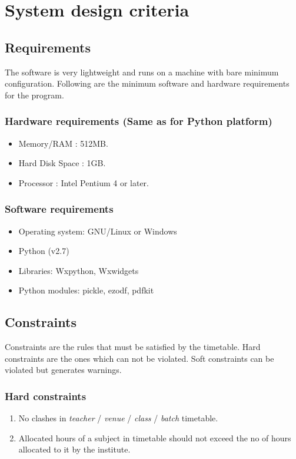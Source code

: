 %

\chapter{System design criteria}
\section{Requirements}
The software is very lightweight and runs on a machine with bare minimum configuration. Following are the minimum software and hardware requirements for the program.
\subsection{Hardware requirements (Same as for Python platform)}
\begin{itemize}
\item Memory/RAM : 512MB.
\item Hard Disk Space : 1GB.
\item Processor : Intel Pentium 4 or later.
\end{itemize}

\subsection{Software requirements}
\begin{itemize}
\item Operating system: GNU/Linux or Windows
\item Python (v2.7)
\item Libraries: Wxpython, Wxwidgets
\item Python modules: pickle, ezodf, pdfkit
\end{itemize}

\section{Constraints}
Constraints are the rules that must be satisfied by the timetable. Hard constraints are the ones which can not be violated. Soft constraints can be violated but generates warnings.
\subsection{Hard constraints}
\begin{enumerate}
\item No clashes in \textit{teacher} / \textit{venue} / \textit{class} / \textit{batch} timetable.
\item Allocated hours of a subject in timetable should not exceed the no of hours allocated to it by the institute.
\end{enumerate}

